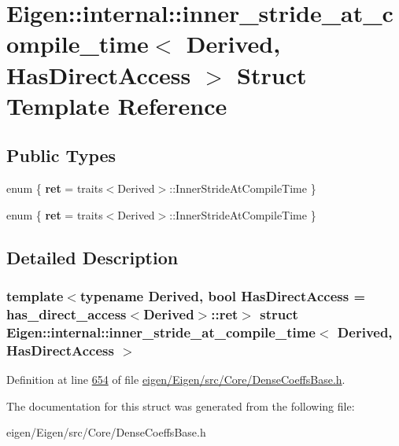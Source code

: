 \hypertarget{struct_eigen_1_1internal_1_1inner__stride__at__compile__time}{}\section{Eigen\+:\+:internal\+:\+:inner\+\_\+stride\+\_\+at\+\_\+compile\+\_\+time$<$ Derived, Has\+Direct\+Access $>$ Struct Template Reference}
\label{struct_eigen_1_1internal_1_1inner__stride__at__compile__time}
\subsection*{Public Types}
\begin{DoxyCompactItemize}
\item 
\mbox{\label{struct_eigen_1_1internal_1_1inner__stride__at__compile__time_a1c65c4113d4f04c0a55f1b0729921d4c}} 
enum \{ {\bfseries ret} = traits$<$Derived$>$\+:\+:Inner\+Stride\+At\+Compile\+Time
 \}
\item 
\mbox{\label{struct_eigen_1_1internal_1_1inner__stride__at__compile__time_a7e4f68f0bc704a4aa412bf6527e082af}} 
enum \{ {\bfseries ret} = traits$<$Derived$>$\+:\+:Inner\+Stride\+At\+Compile\+Time
 \}
\end{DoxyCompactItemize}


\subsection{Detailed Description}
\subsubsection*{template$<$typename Derived, bool Has\+Direct\+Access = has\+\_\+direct\+\_\+access$<$\+Derived$>$\+::ret$>$\newline
struct Eigen\+::internal\+::inner\+\_\+stride\+\_\+at\+\_\+compile\+\_\+time$<$ Derived, Has\+Direct\+Access $>$}



Definition at line \hyperlink{eigen_2_eigen_2src_2_core_2_dense_coeffs_base_8h_source_l00654}{654} of file \hyperlink{eigen_2_eigen_2src_2_core_2_dense_coeffs_base_8h_source}{eigen/\+Eigen/src/\+Core/\+Dense\+Coeffs\+Base.\+h}.



The documentation for this struct was generated from the following file\+:\begin{DoxyCompactItemize}
\item 
eigen/\+Eigen/src/\+Core/\+Dense\+Coeffs\+Base.\+h\end{DoxyCompactItemize}
